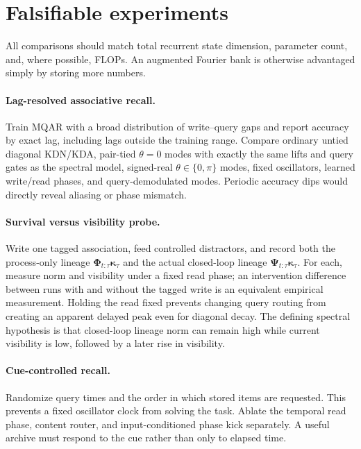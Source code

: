 \documentclass[11pt]{article}
\newcommand{\ve}[1]{\boldsymbol{#1}}
\begin{document}
\section{Falsifiable experiments}

All comparisons should match total recurrent state dimension, parameter count, and, where
possible, FLOPs. An augmented Fourier bank is otherwise advantaged simply by storing more
numbers.

\paragraph{Lag-resolved associative recall.}
Train MQAR with a broad distribution of write--query gaps and report accuracy by exact lag,
including lags outside the training range. Compare ordinary untied diagonal KDN/KDA, pair-tied
$\theta=0$ modes with exactly the same lifts and query gates as the spectral model, signed-real
$\theta\in\{0,\pi\}$ modes, fixed oscillators, learned write/read phases, and
query-demodulated modes. Periodic accuracy dips would directly reveal aliasing or phase
mismatch.

\paragraph{Survival versus visibility probe.}
Write one tagged association, feed controlled distractors, and record both the process-only
lineage $\ve{\Phi}_{t:\tau}\ve{\kappa}_\tau$ and the actual closed-loop lineage
$\ve{\Psi}_{t:\tau}\ve{\kappa}_\tau$. For each, measure norm and visibility under a fixed
read phase; an intervention difference between runs with and without the tagged write is an
equivalent empirical measurement. Holding the read fixed prevents changing query routing from
creating an apparent delayed peak even for diagonal decay. The defining spectral hypothesis
is that closed-loop lineage norm can remain high while current visibility is low, followed by
a later rise in visibility.

\paragraph{Cue-controlled recall.}
Randomize query times and the order in which stored items are requested. This prevents a fixed
oscillator clock from solving the task. Ablate the temporal read phase, content router, and
input-conditioned phase kick separately. A useful archive must respond to the cue rather than
only to elapsed time.
\end{document}
